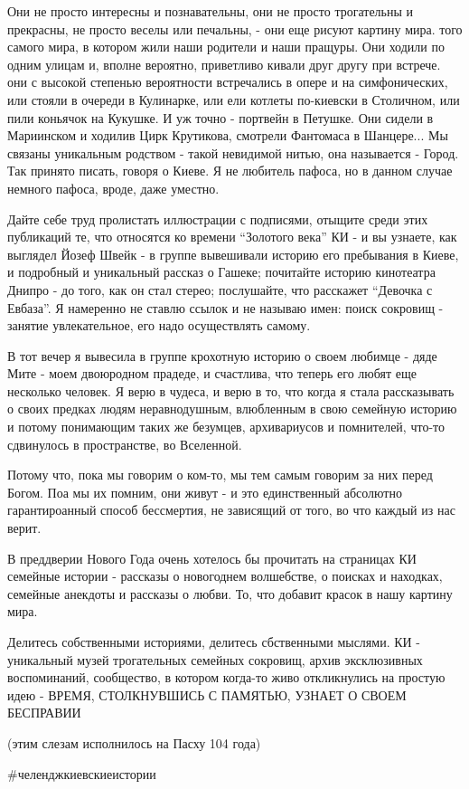 Они не просто интересны и познавательны, они не просто трогательны и прекрасны,
не просто веселы или печальны, - они еще рисуют картину мира. того самого мира,
в котором жили наши родители и наши пращуры. Они ходили по одним улицам и,
вполне вероятно, приветливо кивали друг другу при встрече. они с высокой
степенью вероятности встречались в опере и на симфонических, или стояли в
очереди в Кулинарке, или ели котлеты по-киевски в Столичном, или пили коньячок
на Кукушке. И уж точно - портвейн в Петушке. Они сидели в Мариинском и ходилив
Цирк Крутикова, смотрели Фантомаса в Шанцере... Мы связаны уникальным родством
- такой невидимой нитью, она называется - Город. Так принято писать, говоря о
Киеве. Я не любитель пафоса, но в данном случае немного пафоса, вроде, даже
уместно.

Дайте себе труд пролистать иллюстрации с подписями, отыщите среди этих
публикаций те, что относятся ко времени \enquote{Золотого века} КИ - и вы узнаете, как
выглядел Йозеф Швейк - в группе вывешивали историю его пребывания в Киеве, и
подробный и уникальный рассказ о Гашеке; почитайте историю кинотеатра Днипро -
до того, как он стал стерео; послушайте, что расскажет \enquote{Девочка с Евбаза}. Я
намеренно не ставлю ссылок и не называю имен: поиск сокровищ - занятие
увлекательное, его надо осуществлять самому. 

В тот вечер я вывесила в группе крохотную историю о своем любимце - дяде Мите -
моем двоюродном прадеде, и счастлива, что теперь его любят еще несколько
человек. Я верю в чудеса, и верю в то, что когда я стала рассказывать о своих
предках людям неравнодушным, влюбленным в свою семейную историю и потому
понимающим таких же безумцев, архивариусов и помнителей, что-то сдвинулось в
пространстве, во Вселенной.

Потому что, пока мы говорим о ком-то, мы тем самым говорим за них перед Богом.
Поа мы их помним, они живут - и это единственный абсолютно гарантироанный
способ бессмертия, не зависящий от того, во что каждый из нас верит.

В преддверии Нового Года очень хотелось бы прочитать на страницах КИ семейные
истории - рассказы о новогоднем волшебстве, о поисках и находках, семейные
анекдоты и рассказы о любви. То, что добавит красок в нашу картину мира.

Делитесь собственными историями, делитесь сбственными мыслями. КИ - уникальный
музей трогательных семейных сокровищ, архив эксклюзивных воспоминаний,
сообщество, в котором когда-то живо откликнулись на простую идею - ВРЕМЯ,
СТОЛКНУВШИСЬ С ПАМЯТЬЮ, УЗНАЕТ О СВОЕМ БЕСПРАВИИ

(этим слезам исполнилось на Пасху 104 года)

\#челенджкиевскиеистории

